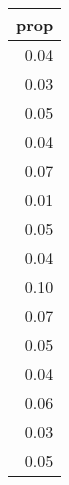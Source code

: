 \begin{tabular}{r}
  \toprule
 prop \\ 
  \midrule
  0.04 \\ 
  0.03 \\ 
  0.05 \\ 
  0.04 \\ 
  0.07 \\ 
  0.01 \\ 
  0.05 \\ 
  0.04 \\ 
  0.10 \\ 
  0.07 \\ 
  0.05 \\ 
  0.04 \\ 
  0.06 \\ 
  0.03 \\ 
  0.05 \\ 
   \bottomrule
\end{tabular}
